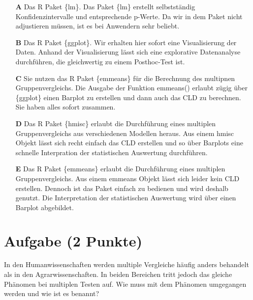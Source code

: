 \documentclass[a4paper, 9pt]{scrartcl}\usepackage[]{graphicx}\usepackage[]{xcolor}
\begin{document}
\begin{enumerate}
\item [\textbf{A} \msquare] Das R Paket \{lm\}. Das Paket \{lm\} erstellt selbstständig Konfidenzintervalle und entsprechende p-Werte. Da wir in dem Paket nicht adjustieren müssen, ist es bei Anwendern sehr beliebt.
\item [\textbf{B} \msquare] Das R Paket \{ggplot\}. Wir erhalten hier sofort eine Visualisierung der Daten. Anhand der Visualisierung lässt sich eine explorative Datenanalyse durchführen, die gleichwertig zu einem Posthoc-Test ist.
\item [\textbf{C} \msquare] Sie nutzen das R Paket \{emmeans\} für die Berechnung des multipnen Gruppenvergleichs. Die Ausgabe der Funktion emmeans() erlaubt zügig über \{ggplot\} einen Barplot zu erstellen und dann auch das CLD zu berechnen. Sie haben alles sofort zusammen.
\item [\textbf{D} \msquare] Das R Paket \{hmisc\} erlaubt die Durchführung eines multiplen Gruppenvergleichs aus verschiedenen Modellen heraus. Aus einem hmisc Objekt lässt sich recht einfach das CLD erstellen und so über Barplots eine schnelle Interpration der statistischen Auswertung durchführen.
\item [\textbf{E} \msquare] Das R Paket \{emmeans\} erlaubt die Durchführung eines multiplen Gruppenvergleichs. Aus einem emmeans Objekt lässt sich leider kein CLD erstellen. Dennoch ist das Paket einfach zu bedienen und wird deshalb genutzt. Die Interpretation der statistischen Auswertung wird über einen Barplot abgebildet.
\end{enumerate}

\section{Aufgabe \hfill (2 Punkte)}



In den Humanwissenschaften werden multiple Vergleiche häufig anders behandelt als in den Agrarwissenschaften. In beiden Bereichen tritt jedoch das gleiche Phänomen bei multiplen Testen auf. Wie muss mit dem Phänomen umgegangen werden und wie ist es benannt?
\end{document}
